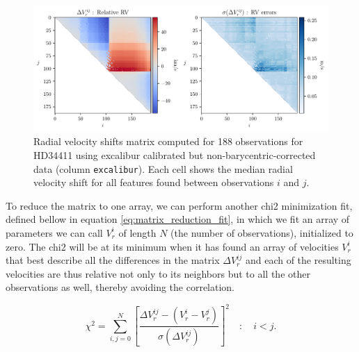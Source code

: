     \begin{figure}%
        \begin{wide}  
            \includegraphics[width=\textwidth]{figures/shfits_matrix_non_bary.pdf}
            \caption{Radial velocity shifts matrix computed for 188 observations for HD34411 using excalibur calibrated but non-barycentric-corrected data (column \texttt{excalibur}). Each cell shows the median radial velocity shift for all features found between observations $i$ and $j$.}
        \label{fig:shift_matrix}
        \end{wide}
    \end{figure}
            
    To reduce the matrix to one array, we can perform another chi2 minimization fit, defined bellow in equation \ref{eq:matrix_reduction_fit}, in which we fit an array of parameters we can call $V_r^i$ of length $N$ (the number of observations), initialized to zero. The chi2 will be at its minimum when it has found an array of velocities $V_r^i$ that best describe all the differences in the matrix $\Delta V_r^{ij}$ and each of the resulting velocities are thus relative not only to its neighbors but to all the other observations as well, thereby avoiding the correlation.
    
    \begin{equation}
        \label{eq:matrix_reduction_fit}
        \chi^{2}=\sum_{i,j = 0}^{N}\left[\frac{ \Delta V_{r}^{ij} - (V_r^i - V_r^j) }{\sigma(\Delta V_{r}^{ij})}\right]^{2} \quad : \quad i < j.
    \end{equation}

